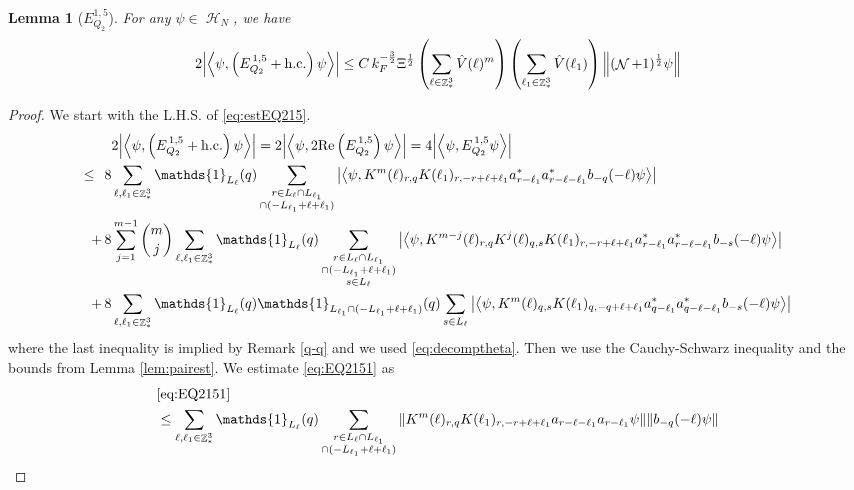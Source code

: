 \documentclass[sn-mathphys, Numbered ,a4paper]{sn-jnl}%
\DeclareMathOperator{\Z}{\mathbb{Z}}
\DeclareMathOperator{\HH}{\mathcal{H}}
\DeclareMathOperator{\NN}{\mathcal{N}}
\newcommand{\half}{\frac{1}{2}}
\newcommand{\eva}[1]{\left\langle #1 \right\rangle}
\theoremstyle{plain}
\newtheorem{lemma}[theorem]{Lemma}
\theoremstyle{definition}
\theoremstyle{remark}
\theoremstyle{plain}
\theoremstyle{definition}
\theoremstyle{remark}
\begin{document}
\begin{lemma}[$E_{Q_2}^{1,5}$]\label{lem:EQ215}
For any $\psi \in \HH_N$, we have
	\begin{align}
    	2\abs{\eva{\psi,\left(E^{\,1,5}_{Q_2}+\mathrm{h.c.}\right) \psi }}
    	\leq C\, k_{F}^{-\frac{3}{2}} \Xi^{\half} \left(\sum\limits_{\ell\in \Z^3_*} \hat{V}(\ell)^m \right) \left(\sum\limits_{\ell_1\in \Z^3_*} \hat{V}(\ell_1) \right) \norm{(\NN+1)^\half \psi } \label{eq:estEQ215}
    \end{align}
\end{lemma}
\begin{proof}
We start with the L.H.S. of \eqref{eq:estEQ215}.
\begin{align}
    &2\abs{\eva{\psi,\left(E^{\,1,5}_{Q_2}+\mathrm{h.c.}\right) \psi }} = 2\abs{\eva{\psi,2\mathrm{Re}\left(E^{\,1,5}_{Q_2}\right) \psi }} = 4\abs{\eva{\psi, E^{\,1,5}_{Q_2} \psi }}\nonumber\\
    \leq\,\;8& \sum\limits_{\ell, \ell_1\in \Z^3_*} \mathds{1}_{L_{\ell}}(q) \sum\limits_{\substack{r\in L_{\ell} \cap L_{\ell_1} \\ \cap (-L_{\ell_1}+\ell+\ell_1)}} \abs{\eva{\psi,  K^m(\ell)_{r,q} K(\ell_1)_{r,-r+\ell+\ell_1}  a^*_{r-\ell_1}a^*_{r-\ell-\ell_1}b_{-q}(-\ell)\psi }} \label{eq:EQ2151}\\
    +\,8& \sum\limits_{j=1}^{m-1} {{m}\choose j} \sum\limits_{\ell, \ell_1\in \Z^3_*}\mathds{1}_{L_{\ell}}(q) \sum\limits_{\substack{r\in L_{\ell} \cap L_{\ell_1}\\ \cap (-L_{\ell_1}+\ell+\ell_1)\\ s \in L_{\ell}}}  \abs{\eva{\psi, K^{m-j}(\ell)_{r,q} K^j(\ell)_{q,s} K(\ell_1)_{r,-r+\ell+\ell_1}  a^*_{r-\ell_1}a^*_{r-\ell-\ell_1}b_{-s}(-\ell) \psi }} \label{eq:EQ2152}\\
    +\,8&\sum\limits_{\ell, \ell_1\in \Z^3_*} \mathds{1}_{L_{\ell}}(q) \mathds{1}_{L_{\ell_1}\cap (-L_{\ell_1}+\ell+\ell_1)}(q) \sum\limits_{ s \in L_{\ell}} \abs{\eva{\psi, K^m(\ell)_{q,s} K(\ell_1)_{q,-q+\ell+\ell_1}  a^*_{q-\ell_1} a^*_{q-\ell-\ell_1} b_{-s}(-\ell) \psi }} \label{eq:EQ2153}
\end{align}
where the last inequality is implied by Remark \ref{q-q} and we used \eqref{eq:decomptheta}.
Then we use the Cauchy-Schwarz inequality and the bounds from Lemma \ref{lem:pairest}.
We estimate \eqref{eq:EQ2151} as
\begin{align}
    &\eqref{eq:EQ2151}\nonumber\\
	&\leq \sum\limits_{\ell, \ell_1\in \Z^3_*} \mathds{1}_{L_{\ell}}(q) \sum\limits_{\substack{r\in L_{\ell} \cap L_{\ell_1} \\ \cap (-L_{\ell_1}+\ell+\ell_1)}} \norm{K^m(\ell)_{r,q} K(\ell_1)_{r,-r+\ell+\ell_1} a_{r-\ell-\ell_1} a_{r-\ell_1} \psi}\norm{  b_{-q}(-\ell) \psi}\nonumber\\

\end{align}
\end{proof}
\end{document}
